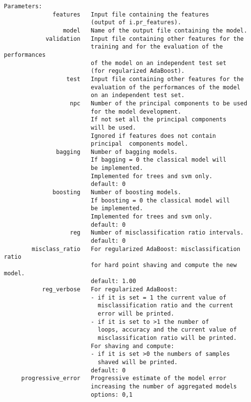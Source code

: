 \begin{verbatim}
Parameters:
              features   Input file containing the features
                         (output of i.pr_features).
                 model   Name of the output file containing the model.
            validation   Input file containing other features for the
                         training and for the evaluation of the performances
                         of the model on an independent test set
                         (for regularized AdaBoost).
                  test   Input file containing other features for the
                         evaluation of the performances of the model
                         on an independent test set.
                   npc   Number of the principal components to be used
                         for the model development.
                         If not set all the principal components
                         will be used.
                         Ignored if features does not contain
                         principal  components model.
               bagging   Number of bagging models.
                         If bagging = 0 the classical model will
                         be implemented.
                         Implemented for trees and svm only.
                         default: 0
              boosting   Number of boosting models.
                         If boosting = 0 the classical model will
                         be implemented.
                         Implemented for trees and svm only.
                         default: 0
                   reg   Number of misclassification ratio intervals.
                         default: 0
        misclass_ratio   For regularized AdaBoost: misclassification ratio
                         for hard point shaving and compute the new model.
                         default: 1.00
           reg_verbose   For regularized AdaBoost:
                         - if it is set = 1 the current value of
                           misclassification ratio and the current
                           error will be printed.
                         - if it is set to >1 the number of
                           loops, accuracy and the current value of
                           misclassification ratio will be printed.
                         For shaving and compute:
                         - if it is set >0 the numbers of samples
                           shaved will be printed.
                         default: 0
     progressive_error   Progressive estimate of the model error
                         increasing the number of aggregated models
                         options: 0,1

\end{verbatim}
